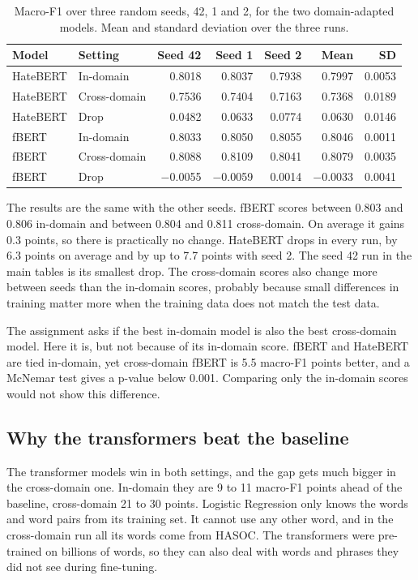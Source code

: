 \documentclass[11pt,a4paper]{article}
\begin{document}
\begin{table}[H]
\centering
\caption{Macro-F1 over three random seeds, 42, 1 and 2, for the two domain-adapted models. Mean and standard deviation over the three runs.}
\label{tab:seeds}
\begin{tabular}{llrrrrr}
\toprule
Model & Setting & Seed 42 & Seed 1 & Seed 2 & Mean & SD \\
\midrule
HateBERT & In-domain    & 0.8018 & 0.8037 & 0.7938 & 0.7997 & 0.0053 \\
HateBERT & Cross-domain & 0.7536 & 0.7404 & 0.7163 & 0.7368 & 0.0189 \\
HateBERT & Drop         & 0.0482 & 0.0633 & 0.0774 & 0.0630 & 0.0146 \\
\midrule
fBERT    & In-domain    & 0.8033 & 0.8050 & 0.8055 & 0.8046 & 0.0011 \\
fBERT    & Cross-domain & 0.8088 & 0.8109 & 0.8041 & 0.8079 & 0.0035 \\
fBERT    & Drop         & $-$0.0055 & $-$0.0059 & 0.0014 & $-$0.0033 & 0.0041 \\
\bottomrule
\end{tabular}
\end{table}

The results are the same with the other seeds. fBERT scores between 0.803 and 0.806 in-domain and between 0.804 and 0.811 cross-domain. On average it gains 0.3 points, so there is practically no change. HateBERT drops in every run, by 6.3 points on average and by up to 7.7 points with seed 2. The seed 42 run in the main tables is its smallest drop. The cross-domain scores also change more between seeds than the in-domain scores, probably because small differences in training matter more when the training data does not match the test data.

The assignment asks if the best in-domain model is also the best cross-domain model. Here it is, but not because of its in-domain score. fBERT and HateBERT are tied in-domain, yet cross-domain fBERT is 5.5 macro-F1 points better, and a McNemar test gives a p-value below 0.001. Comparing only the in-domain scores would not show this difference.

\subsection{Why the transformers beat the baseline}

The transformer models win in both settings, and the gap gets much bigger in the cross-domain one. In-domain they are 9 to 11 macro-F1 points ahead of the baseline, cross-domain 21 to 30 points. Logistic Regression only knows the words and word pairs from its training set. It cannot use any other word, and in the cross-domain run all its words come from HASOC. The transformers were pre-trained on billions of words, so they can also deal with words and phrases they did not see during fine-tuning.
\end{document}

